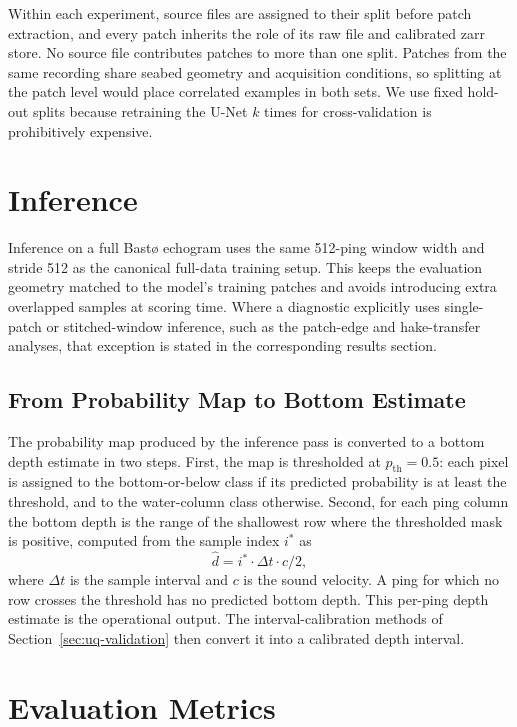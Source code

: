 Within each experiment, source files are assigned to their split before patch extraction, and every patch inherits the role of its raw file and calibrated zarr store. No source file contributes patches to more than one split. Patches from the same recording share seabed geometry and acquisition conditions, so splitting at the patch level would place correlated examples in both sets. We use fixed hold-out splits because retraining the U-Net $k$ times for cross-validation is prohibitively expensive.


\section{Inference}

Inference on a full Bast\o{} echogram uses the same 512-ping window width and stride 512 as the canonical full-data training setup. This keeps the evaluation geometry matched to the model's training patches and avoids introducing extra overlapped samples at scoring time. Where a diagnostic explicitly uses single-patch or stitched-window inference, such as the patch-edge and hake-transfer analyses, that exception is stated in the corresponding results section.

\subsection{From Probability Map to Bottom Estimate}
\label{sec:inference-extraction}

The probability map produced by the inference pass is converted to a bottom depth estimate in two steps. First, the map is thresholded at $p_{\mathrm{th}} = 0.5$: each pixel is assigned to the bottom-or-below class if its predicted probability is at least the threshold, and to the water-column class otherwise. Second, for each ping column the bottom depth is the range of the shallowest row where the thresholded mask is positive, computed from the sample index $i^*$ as
\begin{equation}
    \hat{d} = i^* \cdot \Delta t \cdot c / 2,
\end{equation}
where $\Delta t$ is the sample interval and $c$ is the sound velocity. A ping for which no row crosses the threshold has no predicted bottom depth. This per-ping depth estimate is the operational output. The interval-calibration methods of Section~\ref{sec:uq-validation} then convert it into a calibrated depth interval.


\section{Evaluation Metrics}

